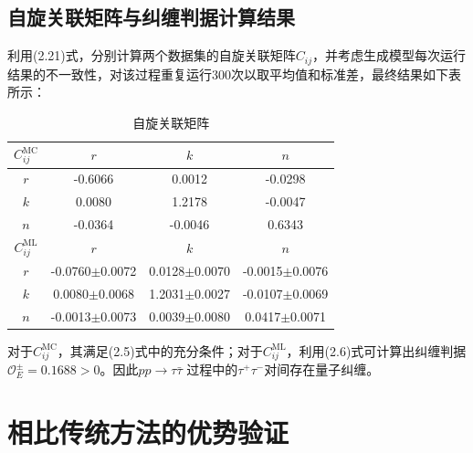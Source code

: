\subsection{自旋关联矩阵与纠缠判据计算结果}
\label{sec:fourponepthree}
利用(2.21)式，分别计算两个数据集的自旋关联矩阵$C_{ij}$，并考虑生成模型每次运行结果的不一致性，对该过程重复运行300次以取平均值和标准差，最终结果如下表所示：
\begin{table}[htbp]
  \centering
  \caption{自旋关联矩阵}
  \label{tab:spincorre}
  \renewcommand{\arraystretch}{1.3}
  \begin{tabular}{c|c c c }
    \toprule[1.5pt]
    $C_{ij}^{\text{MC}}$ & $r$ & $k$ & $n$ \\
    \midrule[1pt]
    $r$ & -0.6066 & 0.0012& -0.0298 \\
    $k$ & 0.0080 & 1.2178 &-0.0047 \\
    $n$ & -0.0364 & -0.0046 &0.6343 \\
    \midrule[1.5pt]
    $C_{ij}^{\text{ML}}$ & $r$ & $k$ & $n$ \\
    \midrule[1pt]
    $r$ & -0.0760$\pm$0.0072 & 0.0128$\pm$0.0070& -0.0015$\pm$0.0076 \\
    $k$ & 0.0080$\pm$0.0068 & 1.2031$\pm$0.0027 &-0.0107$\pm$0.0069 \\
    $n$ & -0.0013$\pm$0.0073 & 0.0039$\pm$0.0080 &0.0417$\pm$0.0071 \\
    \bottomrule[1.5pt]
  \end{tabular}
\end{table}

对于$C_{ij}^{\text{MC}}$，其满足(2.5)式中的充分条件；对于$C_{ij}^{\text{ML}}$，利用(2.6)式可计算出纠缠判据$\mathcal{O}_{E}^{\pm}=0.1688>0$。因此$pp\to \tau \bar{\tau}$ 过程中的$\tau^+ \tau^- $对间存在量子纠缠。

\section{相比传统方法的优势验证}
\label{sec:fourptwo}
